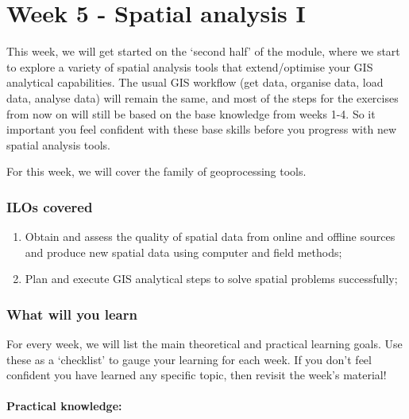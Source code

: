 \documentclass[
  letterpaper,
  DIV=11,
  numbers=noendperiod]{scrreprt}
\begin{document}
\part{Week 5 - Spatial analysis I}

This week, we will get started on the `second half' of the module, where
we start to explore a variety of spatial analysis tools that
extend/optimise your GIS analytical capabilities. The usual GIS workflow
(get data, organise data, load data, analyse data) will remain the same,
and most of the steps for the exercises from now on will still be based
on the base knowledge from weeks 1-4. So it important you feel confident
with these base skills before you progress with new spatial analysis
tools.

For this week, we will cover the family of geoprocessing tools.

\section*{ILOs covered}\label{ilos-covered-4}


\begin{enumerate}
\def\labelenumi{\arabic{enumi}.}
\setcounter{enumi}{1}
\item
  Obtain and assess the quality of spatial data from online and offline
  sources and produce new spatial data using computer and field methods;
\item
  Plan and execute GIS analytical steps to solve spatial problems
  successfully;
\end{enumerate}

\section*{What will you learn}\label{what-will-you-learn-4}


For every week, we will list the main theoretical and practical learning
goals. Use these as a `checklist' to gauge your learning for each week.
If you don't feel confident you have learned any specific topic, then
revisit the week's material!

\subsection*{Practical knowledge:}\label{practical-knowledge-4}
\end{document}

